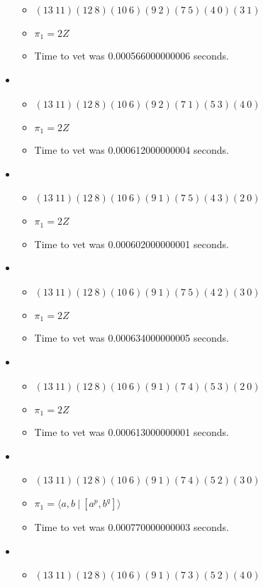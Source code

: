 \documentclass{article}
\begin{document}
\begin{itemize}
\begin{itemize}
      \item $(13\ 11)(12\ 8)(10\ 6)(9\ 2)(7\ 5)(4\ 0)(3\ 1)$
      \item $\pi_1 =2 Z$
      \item Time to vet was 0.000566000000006 seconds.
\end{itemize}
\item \begin{itemize}
      \item $(13\ 11)(12\ 8)(10\ 6)(9\ 2)(7\ 1)(5\ 3)(4\ 0)$
      \item $\pi_1 =2 Z$
      \item Time to vet was 0.000612000000004 seconds.
\end{itemize}
\item \begin{itemize}
      \item $(13\ 11)(12\ 8)(10\ 6)(9\ 1)(7\ 5)(4\ 3)(2\ 0)$
      \item $\pi_1 =2 Z$
      \item Time to vet was 0.000602000000001 seconds.
\end{itemize}
\item \begin{itemize}
      \item $(13\ 11)(12\ 8)(10\ 6)(9\ 1)(7\ 5)(4\ 2)(3\ 0)$
      \item $\pi_1 =2 Z$
      \item Time to vet was 0.000634000000005 seconds.
\end{itemize}
\item \begin{itemize}
      \item $(13\ 11)(12\ 8)(10\ 6)(9\ 1)(7\ 4)(5\ 3)(2\ 0)$
      \item $\pi_1 =2 Z$
      \item Time to vet was 0.000613000000001 seconds.
\end{itemize}
\item \begin{itemize}
      \item $(13\ 11)(12\ 8)(10\ 6)(9\ 1)(7\ 4)(5\ 2)(3\ 0)$
      \item $\pi_1 = \langle a,b\ |\ [a^p,b^q]\rangle$
      \item Time to vet was 0.000770000000003 seconds.
\end{itemize}
\item \begin{itemize}
      \item $(13\ 11)(12\ 8)(10\ 6)(9\ 1)(7\ 3)(5\ 2)(4\ 0)$

\end{itemize}
\end{itemize}
\end{document}
